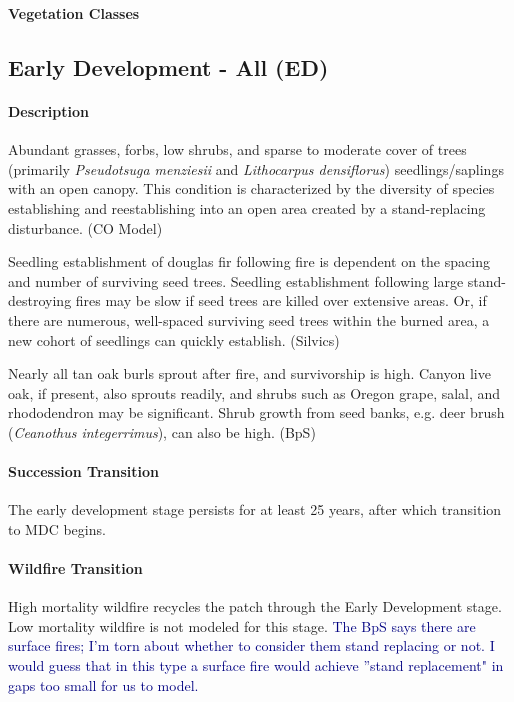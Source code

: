 \documentclass{article}
\newcommand{\mcomment}[1]{\textcolor{navy}{#1}}
\begin{document}
\begin{snugshade}\Large \textbf{Vegetation Classes} \end{snugshade}


\subsection*{Early Development - All (ED)}

\paragraph*{Description} Abundant grasses, forbs, low shrubs, and sparse to moderate cover of trees (primarily \emph{Pseudotsuga menziesii} and \emph{Lithocarpus densiflorus}) seedlings/saplings with an open canopy. This condition is characterized by the diversity of species establishing and reestablishing into an open area created by a stand-replacing disturbance. (CO Model)

Seedling establishment of douglas fir following fire is dependent on the spacing and number of surviving seed trees.  Seedling establishment following large stand-destroying fires may be slow if seed trees are killed over extensive areas. Or, if there are numerous, well-spaced surviving seed trees within the burned area, a new cohort of seedlings can quickly establish. (Silvics) 

Nearly all tan oak burls sprout after fire, and survivorship is high. Canyon live oak, if present, also sprouts readily, and shrubs such as Oregon grape, salal, and rhododendron may be significant. Shrub growth from seed banks, e.g. deer brush (\emph{Ceanothus integerrimus}), can also be high. (BpS)


\paragraph{Succession Transition} The early development stage persists for at least 25 years, after which transition to MDC begins. 

\paragraph{Wildfire Transition} High mortality wildfire recycles the patch through the Early Development stage. Low mortality wildfire is not modeled for this stage. \mcomment{The BpS says there are surface fires; I'm torn about whether to consider them stand replacing or not. I would guess that in this type a surface fire would achieve ''stand replacement" in gaps too small for us to model.}
\end{document}
